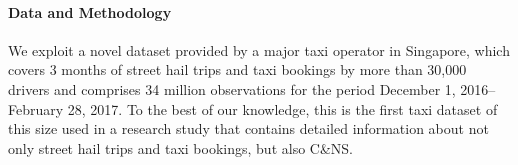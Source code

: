 \documentclass[reviewmode]{restat}
\begin{document}


\paragraph{Data and Methodology} We exploit a novel dataset provided by a major taxi operator in Singapore,
which covers 3 months of street hail trips and taxi bookings by more than 30,000 drivers and comprises 34
million observations for the period December 1, 2016--February 28, 2017. To the best of our knowledge, 
this is the first taxi dataset of this size used in a research study that contains detailed information 
about not only street hail trips and taxi bookings, but also C\&NS. 
\end{document}
